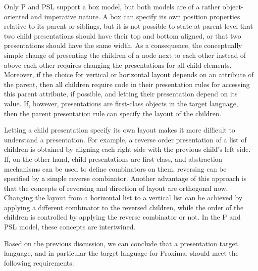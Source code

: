 Only P and PSL support a box model, but both models are of a rather object-oriented and imperative nature. A box can specify its own position properties relative to its parent or siblings, but it is not possible to state at parent level that two child presentations should have their top and bottom aligned, or that two presentations should have the same width. As a consequence, the conceptually simple change of presenting the children of a node next to each other instead of above each other requires changing the presentations for all child elements. Moreover, if the choice for vertical or horizontal layout depends on an attribute of the parent, then all children require code in their presentation rules for accessing this parent attribute, if possible, and letting their presentation depend on its value. If, however, presentations are first-class objects in the target language, then the parent presentation rule can specify the layout of the children.

Letting a child presentation specify its own layout makes it more difficult to understand a presentation. For example, a reverse order presentation of a list of children is obtained by aligning each right side with the previous child's left side. If, on the other hand, child presentations are first-class, and abstraction mechanisms can be used to define combinators on them, reversing can be specified by a simple reverse combinator. Another advantage of this approach is that the concepts of reversing and direction of layout are orthogonal now. Changing the layout from a horizontal list to a vertical list can be achieved by applying a different combinator to the reversed children, while the order of the children is controlled by applying the reverse combinator or not. In the P and PSL model, these concepts are intertwined.

\fromHere


Based on the previous discussion, we can conclude that a presentation target language, and in particular the target language for Proxima, should meet the following requirements: 

